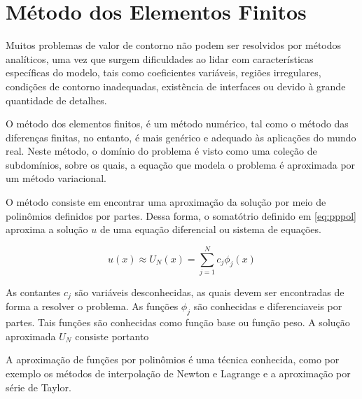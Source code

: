 \section{Método dos Elementos Finitos}

Muitos problemas de valor de contorno não podem ser resolvidos por métodos analíticos, uma vez que surgem dificuldades ao lidar com características específicas do modelo, tais como coeficientes variáveis, regiões irregulares, condições de contorno inadequadas, existência de interfaces ou devido à grande quantidade de detalhes.
\citep[p. 410]{powers}

O método dos elementos finitos, é um método numérico, tal como o método das diferenças finitas, no entanto, é mais genérico e adequado às aplicações do mundo real. Neste método, o domínio do problema é visto como uma coleção de subdomínios, sobre os quais, a equação que modela o problema é aproximada por um método variacional.
\citep[p. 13]{reddy}


O método consiste em encontrar uma aproximação da solução por meio de polinômios definidos por partes. Dessa forma, o somatótrio definido em \ref{eq:pppol} aproxima a solução $ u $ de uma equação diferencial ou sistema de equações.
\citep[p. 97]{davis}

\begin{equation}
	\label{eq:pppol}
	u(x) \approx U_N (x) = \sum_{j = 1}^{N} c_j \phi_j (x)
\end{equation}

As contantes $ c_j $ são variáveis desconhecidas, as quais devem ser encontradas de forma a resolver o problema. As funções $ \phi_j $ são conhecidas e diferenciaveis por partes. Tais funções são conhecidas como função base ou função peso. A solução aproximada $ U_N $ consiste portanto

A aproximação de funções por polinômios é uma técnica conhecida, como por exemplo os métodos de interpolação de Newton e Lagrange e a aproximação por série de Taylor. 

